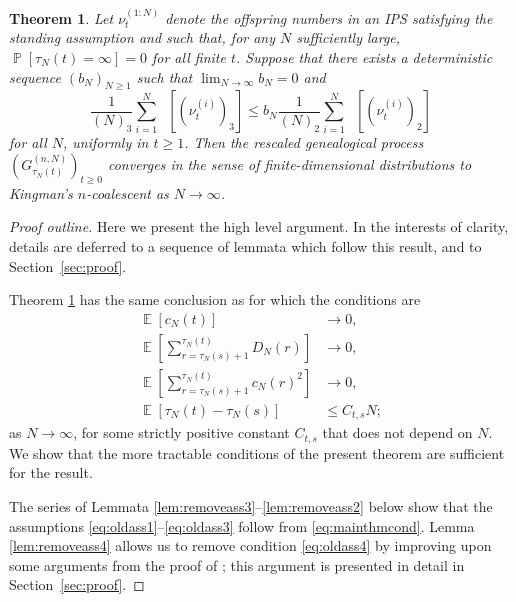 \documentclass{article} %
\newtheorem{theorem}{Theorem}
\theoremstyle{definition}
\DeclareMathOperator{\Prob}{\mathbb{P}}
\DeclareMathOperator{\E}{\mathbb{E}}
\DeclareMathOperator{\Et}{\mathbb{E}_t}
\newcommand{\1}[1]{\mathbbm{1}_{\{#1\}}}
\begin{document}
\begin{theorem}\label{thm:generalconv}
Let $\nu_t^{(1:N)}$ denote the offspring numbers in an IPS satisfying the standing assumption and such that, for any $N$ sufficiently large, $\Prob[ \tau_N(t) = \infty ] =0$ for all finite $t$. Suppose that there exists a deterministic sequence $(b_N)_{N\geq1}$ such that ${\lim}_{N\to\infty} b_N =0$ and
\begin{equation}\label{eq:mainthmcond}
\frac{1}{(N)_3} \sum_{i = 1}^N \Et\left[ (\nu_t^{(i)})_3 \right]  \leq b_N \frac{1}{(N)_2} \sum_{i = 1}^N \Et\left[ (\nu_t^{(i)})_2 \right]
\end{equation}
for all $N$, uniformly in $t \geq 1$.
Then the rescaled genealogical process $(G_{\tau_N(t)}^{(n,N)})_{t\geq0}$ converges in the sense of finite-dimensional distributions to Kingman's $n$-coalescent as $N \to \infty$.
\end{theorem}

\begin{proof}[Proof outline]
Here we present the high level argument. In the interests of clarity, details are deferred to a sequence of lemmata which follow this result, and to Section~\ref{sec:proof}.

Theorem \ref{thm:generalconv} has the same conclusion as \cite[Theorem 1]{koskela2018} for which the conditions are
\begin{align}
\E[ c_N(t) ] &\rightarrow 0 , \label{eq:oldass1}\\
\E \left[ \sum_{ r = \tau_N( s ) + 1 }^{ \tau_N( t ) } D_N( r ) \right] &\rightarrow 0, \label{eq:oldass2}\\
\E \left[ \sum_{ r = \tau_N( s ) + 1 }^{ \tau_N( t ) } c_N( r )^2 \right] &\rightarrow 0 , \label{eq:oldass3}\\
\E [ \tau_N(t) - \tau_N(s) ] &\leq C_{t,s} N; \label{eq:oldass4}
\end{align}
as $N\to\infty$, for some strictly positive constant $C_{t,s}$ that does not depend on $N$. We show that the more tractable conditions of the present theorem are sufficient for the result.

The series of Lemmata \ref{lem:removeass3}--\ref{lem:removeass2} below show that the assumptions \eqref{eq:oldass1}--\eqref{eq:oldass3} follow from \eqref{eq:mainthmcond}. Lemma \ref{lem:removeass4} allows us to remove condition \eqref{eq:oldass4} by improving upon some arguments from the proof of \cite[Theorem 1]{koskela2018}; this argument is presented in detail in Section~\ref{sec:proof}.
\end{proof}
\end{document}
